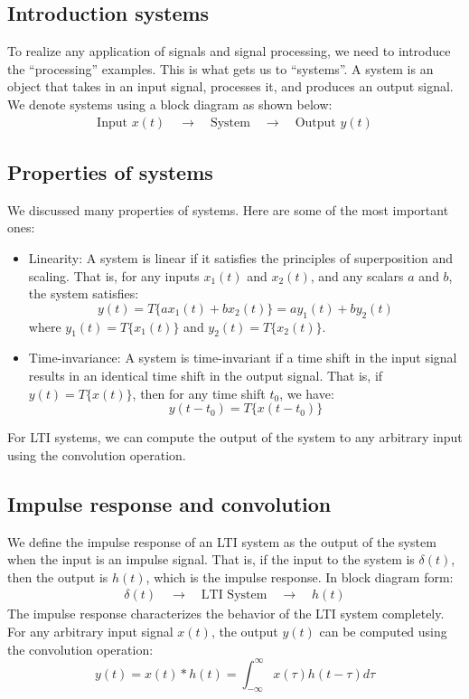 \documentclass{ee102_notes}
\begin{document}
\subsection{Introduction systems}
To realize any application of signals and signal processing, we need to introduce the ``processing'' examples. This is what gets us to ``systems''. A system is an object that takes in an input signal, processes it, and produces an output signal. We denote systems using a block diagram as shown below:
\[
\begin{array}{c}
\text{Input } x(t) \quad \longrightarrow \quad \boxed{\text{System}} \quad \longrightarrow \quad \text{Output } y(t)
\end{array}
\]

\subsection{Properties of systems}
We discussed many properties of systems. Here are some of the most important ones:
\begin{itemize}
\item Linearity: A system is linear if it satisfies the principles of superposition and scaling. That is, for any inputs $x_1(t)$ and $x_2(t)$, and any scalars $a$ and $b$, the system satisfies: 
\[
y(t) = T\{ax_1(t) + bx_2(t)\} = ay_1(t) + by_2(t)
\]
where $y_1(t) = T\{x_1(t)\}$ and $y_2(t) = T\{x_2(t)\}$.
\item Time-invariance: A system is time-invariant if a time shift in the input signal results in an identical time shift in the output signal. That is, if $y(t) = T\{x(t)\}$, then for any time shift $t_0$, we have: 
\[
y(t - t_0) = T\{x(t - t_0)\}
\]
\end{itemize}

For LTI systems, we can compute the output of the system to any arbitrary input using the convolution operation. 
\subsection{Impulse response and convolution}
We define the impulse response of an LTI system as the output of the system when the input is an impulse signal. That is, if the input to the system is $\delta(t)$, then the output is $h(t)$, which is the impulse response. In block diagram form:
\[
\begin{array}{c}
\delta(t) \quad \longrightarrow \quad \boxed{\text{LTI System}} \quad \longrightarrow \quad h(t)
\end{array}
\]
The impulse response characterizes the behavior of the LTI system completely. For any arbitrary input signal $x(t)$, the output $y(t)$ can be computed using the convolution operation:
\[
y(t) = x(t) * h(t) = \int_{-\infty}^{\infty} x(\tau) h(t - \tau) d\tau
\]
\end{document}
